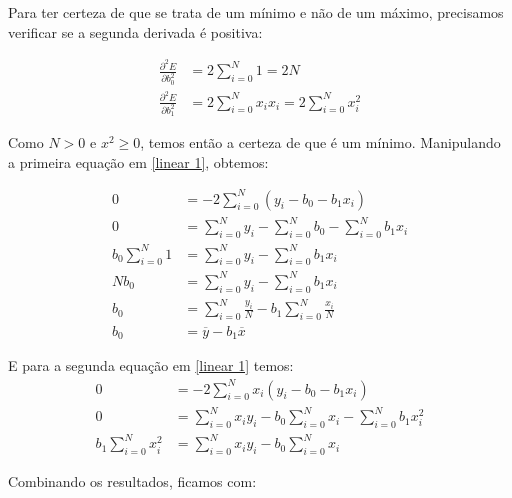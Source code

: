 Para ter certeza de que se trata de um mínimo e não de um máximo, precisamos verificar se a segunda derivada é positiva:

\begin{equation}
    \begin{split}
        \frac{\partial^{2}E}{\partial b_{0}^{2}}	& =2\sum_{i=0}^{N}1=2N \\
        \frac{\partial^{2}E}{\partial b_{1}^{2}}	& =2\sum_{i=0}^{N}x_{i}x_{i}=2\sum_{i=0}^{N}x_{i}^{2}
    \end{split}
\end{equation}

Como $N>0$  e $x^2\geq0$, temos então a certeza de que é um mínimo.  Manipulando a primeira equação em \ref{linear 1}, obtemos: 

\begin{equation}
    \begin{split}
        0	& =-2\sum_{i=0}^{N}\left(y_{i}-b_{0}-b_{1}x_{i}\right)\\
        0 & =\sum_{i=0}^{N}y_{i}-\sum_{i=0}^{N}b_{0}-\sum_{i=0}^{N}b_{1}x_{i}\\
        b_{0}\sum_{i=0}^{N}1	& =\sum_{i=0}^{N}y_{i}-\sum_{i=0}^{N}b_{1}x_{i}\\
        Nb_{0}	& =\sum_{i=0}^{N}y_{i}-\sum_{i=0}^{N}b_{1}x_{i}\\
        b_{0}	& =\sum_{i=0}^{N}\frac{y_{i}}{N}-b_{1}\sum_{i=0}^{N}\frac{x_{i}}{N}\\
        b_{0}	& =\overline{y}-b_{1}\overline{x}
    \end{split}
\end{equation}

E para a segunda equação em \ref{linear 1} temos:
 \begin{equation}
     \begin{split}
        0	&=-2\sum_{i=0}^{N}x_{i}\left(y_{i}-b_{0}-b_{1}x_{i}\right)\\
        0&	=\sum_{i=0}^{N}x_{i}y_{i}-b_{0}\sum_{i=0}^{N}x_{i}-\sum_{i=0}^{N}b_{1}x_{i}^{2}\\
        b_{1}\sum_{i=0}^{N}x_{i}^{2}	&=\sum_{i=0}^{N}x_{i}y_{i}-b_{0}\sum_{i=0}^{N}x_{i}         
     \end{split}
 \end{equation}
 
Combinando os resultados, ficamos com:

